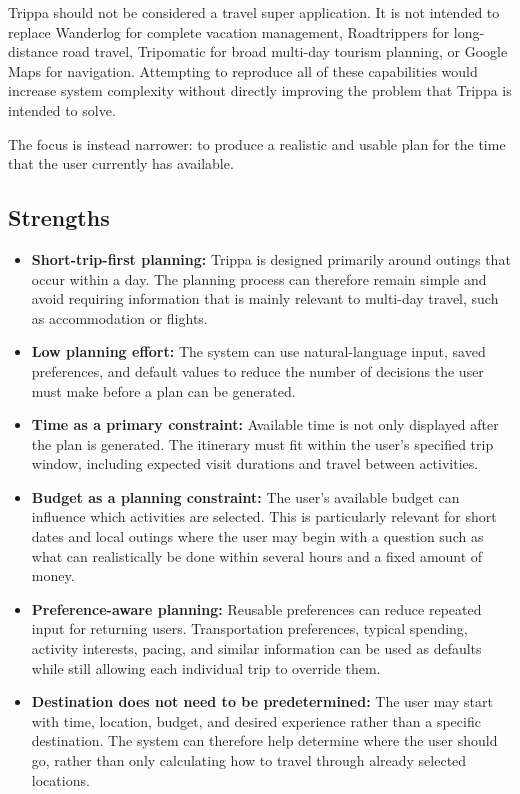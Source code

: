 Trippa should not be considered a travel super application. It is not intended to replace Wanderlog for complete vacation management, Roadtrippers for long-distance road travel, Tripomatic for broad multi-day tourism planning, or Google Maps for navigation. Attempting to reproduce all of these capabilities would increase system complexity without directly improving the problem that Trippa is intended to solve.


The focus is instead narrower: to produce a realistic and usable plan for the time that the user currently has available.


\subsection{Strengths}

\begin{itemize}
\item \textbf{Short-trip-first planning:} Trippa is designed primarily around outings that occur within a day. The planning process can therefore remain simple and avoid requiring information that is mainly relevant to multi-day travel, such as accommodation or flights.
\item \textbf{Low planning effort:} The system can use natural-language input, saved preferences, and default values to reduce the number of decisions the user must make before a plan can be generated.
\item \textbf{Time as a primary constraint:} Available time is not only displayed after the plan is generated. The itinerary must fit within the user's specified trip window, including expected visit durations and travel between activities.
\item \textbf{Budget as a planning constraint:} The user's available budget can influence which activities are selected. This is particularly relevant for short dates and local outings where the user may begin with a question such as what can realistically be done within several hours and a fixed amount of money.
\item \textbf{Preference-aware planning:} Reusable preferences can reduce repeated input for returning users. Transportation preferences, typical spending, activity interests, pacing, and similar information can be used as defaults while still allowing each individual trip to override them.
\item \textbf{Destination does not need to be predetermined:} The user may start with time, location, budget, and desired experience rather than a specific destination. The system can therefore help determine where the user should go, rather than only calculating how to travel through already selected locations.

\end{itemize}

